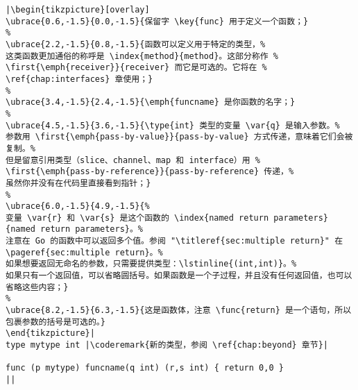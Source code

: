 \begin{lstlisting}[caption=函数定义,label=src:function definition]
|\begin{tikzpicture}[overlay]
\ubrace{0.6,-1.5}{0.0,-1.5}{保留字 \key{func} 用于定义一个函数；}
%
\ubrace{2.2,-1.5}{0.8,-1.5}{函数可以定义用于特定的类型，%
这类函数更加通俗的称呼是 \index{method}{method}。这部分称作 %
\first{\emph{receiver}}{receiver} 而它是可选的。它将在 %
\ref{chap:interfaces} 章使用；}
%
\ubrace{3.4,-1.5}{2.4,-1.5}{\emph{funcname} 是你函数的名字；}
%
\ubrace{4.5,-1.5}{3.6,-1.5}{\type{int} 类型的变量 \var{q} 是输入参数。%
参数用 \first{\emph{pass-by-value}}{pass-by-value} 方式传递，意味着它们会被复制。%
但是留意引用类型（slice、channel、map 和 interface）用 %
\first{\emph{pass-by-reference}}{pass-by-reference} 传递，%
虽然你并没有在代码里直接看到指针；}
%
\ubrace{6.0,-1.5}{4.9,-1.5}{%
变量 \var{r} 和 \var{s} 是这个函数的 \index{named return parameters}{named return parameters}。%
注意在 Go 的函数中可以返回多个值。参阅 "\titleref{sec:multiple return}" 在 \pageref{sec:multiple return}。%
如果想要返回无命名的参数，只需要提供类型：\lstinline{(int,int)}。%
如果只有一个返回值，可以省略圆括号。如果函数是一个子过程，并且没有任何返回值，也可以省略这些内容；}
%
\ubrace{8.2,-1.5}{6.3,-1.5}{这是函数体，注意 \func{return} 是一个语句，所以包裹参数的括号是可选的。}
\end{tikzpicture}|
type mytype int	|\coderemark{新的类型，参阅 \ref{chap:beyond} 章节}|

func (p mytype) funcname(q int) (r,s int) { return 0,0 }
||
\end{lstlisting}
